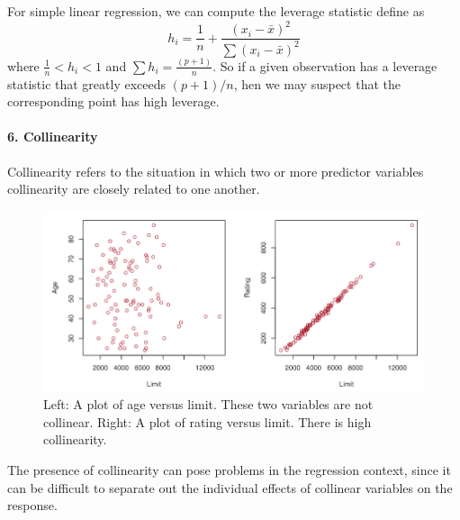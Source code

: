For simple linear regression, we can compute the leverage statistic define as
\[ h_i = \frac{1}{n} + \frac{(x_i - \bar{x})^2}{\sum (x_i - \bar{x})^2} \]
where $\frac{1}{n} < h_i < 1$ and $\sum h_i = \frac{(p+1)}{n}$.
So if a given observation has a leverage statistic that greatly exceeds $(p+1)/n$, hen we may suspect that the corresponding point has high leverage.

\paragraph{6. Collinearity}
Collinearity refers to the situation in which two or more predictor variables collinearity are closely related to one another.

\begin{figure}[!ht]
    \centering
    \includegraphics[scale=0.6]{src/StatisticalLearning/Collinearity.PNG}
    \caption{Left: A plot of age versus limit. These two variables are not collinear. Right: A plot of rating versus limit. There is high collinearity.}
\end{figure}

The presence of collinearity can pose problems in the regression context, since it can be difficult to separate out the individual effects of collinear variables on the response.

